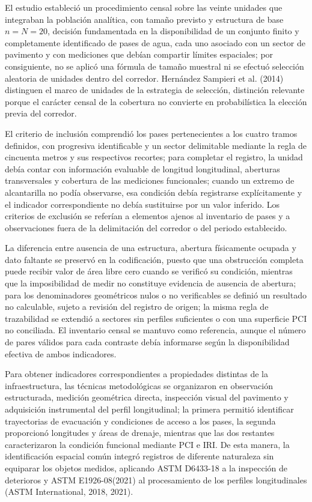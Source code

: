 
El estudio estableció un procedimiento censal sobre las veinte unidades que integraban la población analítica, con tamaño previsto y estructura de base \(n=N=20\), decisión fundamentada en la disponibilidad de un conjunto finito y completamente identificado de pases de agua, cada uno asociado con un sector de pavimento y con mediciones que debían compartir límites espaciales; por consiguiente, no se aplicó una fórmula de tamaño muestral ni se efectuó selección aleatoria de unidades dentro del corredor. Hernández Sampieri et al. (2014) distinguen el marco de unidades de la estrategia de selección, distinción relevante porque el carácter censal de la cobertura no convierte en probabilística la elección previa del corredor.

El criterio de inclusión comprendió los pases pertenecientes a los cuatro tramos definidos, con progresiva identificable y un sector delimitable mediante la regla de cincuenta metros y sus respectivos recortes; para completar el registro, la unidad debía contar con información evaluable de longitud longitudinal, aberturas transversales y cobertura de las mediciones funcionales; cuando un extremo de alcantarilla no podía observarse, esa condición debía registrarse explícitamente y el indicador correspondiente no debía sustituirse por un valor inferido. Los criterios de exclusión se referían a elementos ajenos al inventario de pases y a observaciones fuera de la delimitación del corredor o del periodo establecido.

La diferencia entre ausencia de una estructura, abertura físicamente ocupada y dato faltante se preservó en la codificación, puesto que una obstrucción completa puede recibir valor de área libre cero cuando se verificó su condición, mientras que la imposibilidad de medir no constituye evidencia de ausencia de abertura; para los denominadores geométricos nulos o no verificables se definió un resultado no calculable, sujeto a revisión del registro de origen; la misma regla de trazabilidad se extendió a sectores sin perfiles suficientes o con una superficie PCI no conciliada. El inventario censal se mantuvo como referencia, aunque el número de pares válidos para cada contraste debía informarse según la disponibilidad efectiva de ambos indicadores.


Para obtener indicadores correspondientes a propiedades distintas de la infraestructura, las técnicas metodológicas se organizaron en observación estructurada, medición geométrica directa, inspección visual del pavimento y adquisición instrumental del perfil longitudinal; la primera permitió identificar trayectorias de evacuación y condiciones de acceso a los pases, la segunda proporcionó longitudes y áreas de drenaje, mientras que las dos restantes caracterizaron la condición funcional mediante PCI e IRI. De esta manera, la identificación espacial común integró registros de diferente naturaleza sin equiparar los objetos medidos, aplicando ASTM D6433-18 a la inspección de deterioros y ASTM E1926-08(2021) al procesamiento de los perfiles longitudinales (ASTM International, 2018, 2021).

